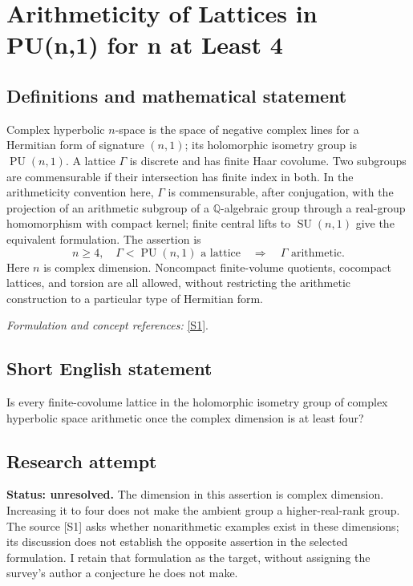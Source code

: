 \documentclass[11pt]{article}
\begin{document}
\section*{\texorpdfstring{Arithmeticity of Lattices in PU(n,1) for n at Least 4}{Arithmeticity of Lattices in PU(n,1) for n at Least 4}}\label{statement}
\subsection{Definitions and mathematical statement}
Complex hyperbolic $n$-space is the space of negative complex lines for a Hermitian form of signature $(n,1)$; its holomorphic isometry group is $\operatorname{PU}(n,1)$. A lattice $\Gamma$ is discrete and has finite Haar covolume. Two subgroups are commensurable if their intersection has finite index in both. In the arithmeticity convention here, $\Gamma$ is commensurable, after conjugation, with the projection of an arithmetic subgroup of a ${\mathbb{Q}}$-algebraic group through a real-group homomorphism with compact kernel; finite central lifts to $\operatorname{SU}(n,1)$ give the equivalent formulation. The assertion is
\[
 n\ge4,\quad\Gamma<\operatorname{PU}(n,1)\text{ a lattice}
 \quad\Longrightarrow\quad\Gamma\text{ arithmetic}.
\]
Here $n$ is complex dimension. Noncompact finite-volume quotients, cocompact lattices, and torsion are all allowed, without restricting the arithmetic construction to a particular type of Hermitian form.
\par\smallskip\textit{Formulation and concept references:} \href{https://www.maths.dur.ac.uk/users/j.r.parker/img/Lattices.pdf}{[S1]}.

\subsection{Short English statement}
Is every finite-covolume lattice in the holomorphic isometry group of complex hyperbolic space arithmetic once the complex dimension is at least four?
\subsection{Research attempt}
\textbf{Status: unresolved.} The dimension in this assertion is complex dimension. Increasing it to four does not make the ambient group a higher-real-rank group. The source [S1] asks whether nonarithmetic examples exist in these dimensions; its discussion does not establish the opposite assertion in the selected formulation. I retain that formulation as the target, without assigning the survey's author a conjecture he does not make.
\end{document}
